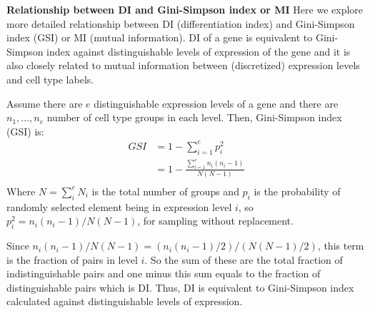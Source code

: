 \textbf{Relationship between DI and Gini-Simpson index or MI} 
Here we explore more detailed relationship between DI (differentiation index) and Gini-Simpson index (GSI) or MI (mutual information). DI of a gene is equivalent to Gini-Simpson index against distinguishable levels of expression of the gene and it is also closely related to mutual information between (discretized) expression levels and cell type labels. 

Assume there are $e$ distinguishable expression levels of a gene and there are $n_1,...,n_e$ number of cell type groups in each level. Then, Gini-Simpson index (GSI) is:
\begin{align}
GSI &= 1 - \sum_{i=1}^{e}{p_{i}^2} \\
    &= 1 - \frac{\sum_{i=1}^{e}{n_i(n_i-1)}}{N(N-1)} \\
\end{align}
Where $N=\sum_{i}^{e}{N_i}$ is the total number of groups and $p_{i}$ is the probability of randomly selected element being in expression level $i$, so $p_{i}^2=n_i(n_i-1)/N(N-1)$, for sampling without replacement. 

Since $n_i(n_i-1)/N(N-1)=(n_i(n_i-1)/2)/(N(N-1)/2)$, this term is the fraction of pairs in level $i$. So the sum of these are the total fraction of indistinguishable pairs and one minus this sum equals to the fraction of distinguishable pairs which is DI. Thus, DI is equivalent to Gini-Simpson index calculated against distinguishable levels of expression.

